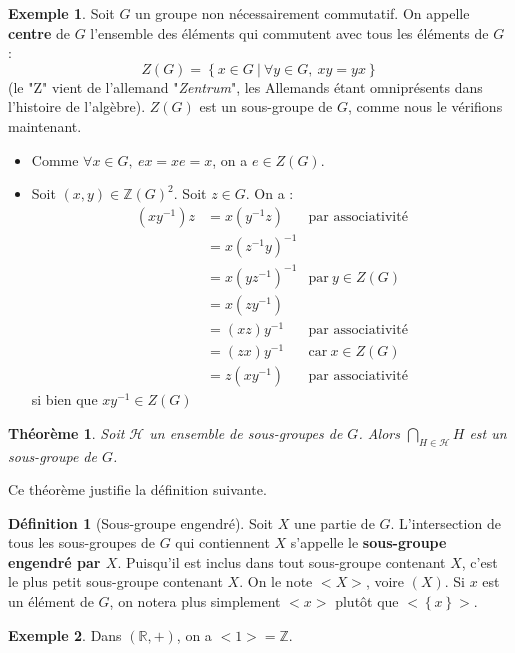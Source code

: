 \documentclass[french]{book}
\newcommand{\Z}{\mathbb{Z}}
\newcommand{\R}{\mathbb{R}}
\newcommand{\inv}{^{-1}}
\theoremstyle{plain}
\newtheorem{thm}{Théorème}[chapter]
\theoremstyle{definition}
\newtheorem{dfn}{Définition}[chapter]
\newtheorem{exa}{Exemple}[chapter]
\theoremstyle{remark}
\begin{document}
\begin{exa}
	Soit $G$ un groupe non nécessairement commutatif. On appelle \textbf{centre} de $G$ l'ensemble des éléments qui commutent avec tous les éléments de $G$ : $$Z(G)=\left\{x\in G\ | \ \forall y\in G,\ xy=yx\right\}$$ (le "Z" vient de l'allemand "\textit{Zentrum}", les Allemands étant omniprésents dans l'histoire de l'algèbre). $Z(G)$ est un sous-groupe de $G$, comme nous le vérifions maintenant.
	\begin{itemize}
		\item Comme $\forall x\in G,\ ex=xe=x$, on a $e\in Z(G)$.
		\item Soit $(x,y)\in\Z(G)^2$. Soit $z\in G$. On a :
		\begin{align*}
			(xy\inv)z&=x(y\inv z) & \text{par associativité} \\
			&=x(z\inv y)\inv \\
			&=x(yz\inv)\inv & \text{par} \ y\in Z(G) \\
			&=x(zy\inv)\\
			&=(xz)y\inv & \text{par associativité} \\
			&=(zx)y\inv & \text{car} \ x\in Z(G)\\
			&=z(xy\inv) & \text{par associativité}
		\end{align*}
		si bien que $xy\inv\in Z(G)$
	\end{itemize}
\end{exa}
\begin{thm}
	Soit $\mathcal{H}$ un ensemble de sous-groupes de $G$. Alors $\displaystyle \bigcap_{H\in\mathcal{H}} H$ est un sous-groupe de $G$.
\end{thm}
Ce théorème justifie la définition suivante.
\begin{dfn}[Sous-groupe engendré]
	Soit $X$ une partie de $G$. L'intersection de tous les sous-groupes de $G$ qui contiennent $X$ s'appelle le \textbf{sous-groupe engendré par $X$}. Puisqu'il est inclus dans tout sous-groupe contenant $X$, c'est le plus petit sous-groupe contenant $X$. On le note $<X>$, voire $(X)$. Si $x$ est un élément de $G$, on notera plus simplement $<x>$ plutôt que $<\left\{x\right\}>$.
\end{dfn}
\begin{exa}
	Dans $(\R,+)$, on a $<1>=\Z$.
\end{exa}
\end{document}
